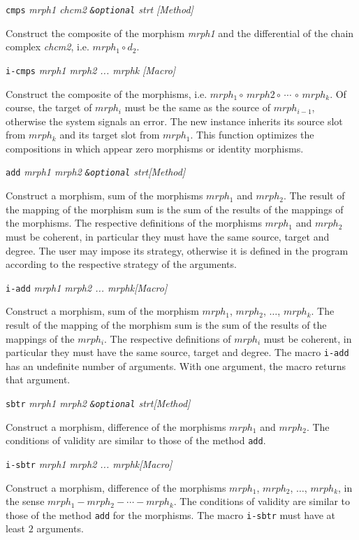 \newpage
{\parindent=0mm
{\leftskip=5mm
{\tt cmps} {\em mrph1 chcm2 {\tt \&optional} strt} \hfill{\em [Method]}\par }
{\leftskip=15mm
Construct the composite of the morphism {\em mrph1} and the differential of the chain complex {\em chcm2},
i.e. $mrph_1 \circ d_2$. \par}
{\leftskip=5mm
{\tt i-cmps} {\em mrph1 mrph2 ... mrphk} \hfill{\em [Macro]}\par }
{\leftskip=15mm
Construct the  composite of the morphisms, i.e. $mrph_1 \circ\, mrph2 \circ\, \cdots\, \circ\, mrph_k$.
Of course, the target of $mrph_i$ must be the same as the source of $mrph_{i-1}$, otherwise the
system signals an error. The new instance  inherits
its source slot from $mrph_k$ and its target slot from $mrph_1$. This function optimizes
the compositions in which appear zero morphisms or identity morphisms. \par}
{\leftskip=5mm
{\tt add} {\em mrph1 mrph2 {\tt \&optional} strt}\hfill {\em [Method]}  \par }
{\leftskip=15mm
Construct a morphism, sum  of the  morphisms $mrph_1$ and  $mrph_2$.  The result of the mapping
of the morphism sum is the sum of the results of the mappings of the morphisms.
The respective definitions of the morphisms $mrph_1$ and  $mrph_2$  must be coherent,
in particular they must have the same  source, target and degree. The user may impose
its strategy, otherwise it is defined in the program according to the respective
strategy of the arguments.\par}
{\leftskip=5mm
{\tt i-add} {\em mrph1 mrph2 ... mrphk}\hfill {\em [Macro]}  \par }
{\leftskip=15mm
Construct a morphism, sum  of the  morphism $mrph_1$,  $mrph_2$, $\ldots$, $mrph_k$.  The result of the mapping
of the morphism sum is the sum of the results of the mappings of the $mrph_i$.
The respective definitions of $mrph_i$ must be coherent, in particular they must have the same
source, target and degree. The macro {\tt i-add} has an undefinite number of arguments.
With one argument, the macro returns that argument.\par}
{\leftskip=5mm
{\tt sbtr} {\em mrph1 mrph2 {\tt \&optional} strt}\hfill {\em [Method]}  \par }
{\leftskip=15mm
Construct a morphism, difference  of the  morphisms $mrph_1$ and  $mrph_2$. The conditions of validity are
similar to those of the method {\tt add}. \par}
{\leftskip=5mm
{\tt i-sbtr} {\em mrph1 mrph2 ... mrphk}\hfill {\em [Macro]}  \par }
{\leftskip=15mm
Construct a morphism, difference  of the  morphisms $mrph_1$,  $mrph_2$, $\ldots$, $mrph_k$, in the sense
$mrph_1 -  mrph_2 - \cdots - mrph_k$. The conditions of validity are similar to those of the method
{\tt add} for the morphisms. The macro {\tt i-sbtr} must have at least $2$ arguments.  \par}
}
